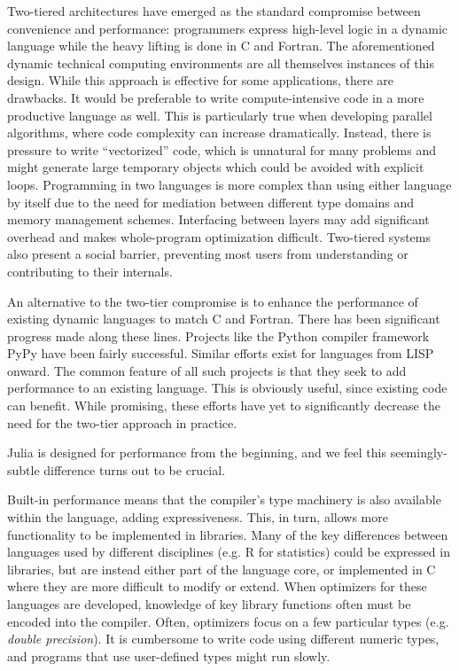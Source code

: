 \documentclass[9pt]{sigplanconf}
\begin{document}
Two-tiered architectures have emerged as the standard compromise between
convenience and performance: programmers express high-level logic in a
dynamic language while the heavy lifting is done in C and Fortran. The
aforementioned dynamic technical computing environments are all themselves
instances of this design. While this approach is effective for some
applications, there are drawbacks. It would be preferable to write
compute-intensive code in a more productive language as well. This is
particularly true when developing parallel algorithms, where code
complexity can increase dramatically. Instead, there is pressure to write
``vectorized'' code, which is unnatural for many problems and might
generate large temporary objects which could be avoided with explicit
loops. Programming in two languages is more complex than using either
language by itself due to the need for mediation between different type
domains and memory management schemes. Interfacing between layers may add
significant overhead and makes whole-program optimization difficult.
Two-tiered systems also present a social barrier, preventing most users
from understanding or contributing to their internals.

An alternative to the two-tier compromise is to enhance the performance of
existing dynamic languages to match C and Fortran. There has been
significant progress made along these lines. Projects like the Python
compiler framework PyPy \cite{pypyjit} have been fairly successful.
Similar efforts exist for languages from LISP onward. The common feature
of all such projects is that they seek to add performance to an existing
language. This is obviously useful, since existing code can benefit. While
promising, these efforts have yet to significantly decrease the need for
the two-tier approach in practice.

Julia is designed for performance from the beginning, and we feel this
seemingly-subtle difference turns out to be crucial.


Built-in performance means that the compiler's type machinery is
also available within the language, adding expressiveness. This, in turn,
allows more functionality to be implemented in libraries. Many of the key
differences between languages used by different disciplines (e.g. R for
statistics) could be expressed in libraries, but are instead either part
of the language core, or implemented in C where they are more difficult to
modify or extend. When optimizers for these languages are developed,
knowledge of key library functions often must be encoded into the
compiler. Often, optimizers focus on a few particular types (e.g. {\it
double precision}). It is cumbersome to write code using different numeric
types, and programs that use user-defined types might run slowly.
\end{document}
